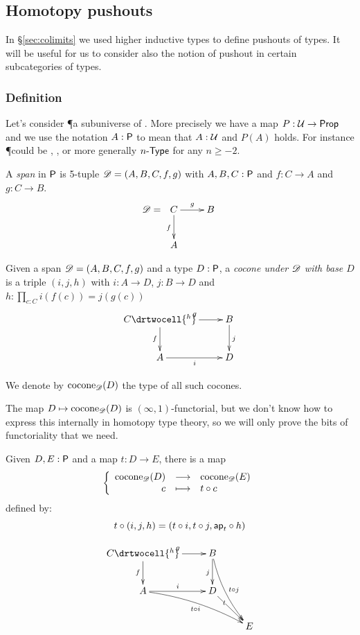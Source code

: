 \subsection{Homotopy pushouts}
\label{sec:pushouts}

In \S\ref{sec:colimits} we used higher inductive types to define pushouts of types.
It will be useful for us to consider also the notion of pushout in certain subcategories of types.

\subsubsection{Definition}
\label{sec:push:definition}

Let's consider \P a subuniverse of \type. More precisely we have a map
$P:\type\to\prop$ and we use the notation $A:\P$ to mean that $A:\type$ and
$P(A)$ holds. For instance \P could be \prop, \set, or more generally
$\typele{n}$ for any $n\ge-2$.

\begin{defn}
  A \emph{span} in $\P$ is 5-tuple $\Ddiag=(A,B,C,f,g)$ with
  $A,B,C:\P$ and $f:C\to{}A$ and $g:C\to{}B$.
  \[\Ddiag=\xymatrix{C \ar^g[r] \ar_f[d] & B \\ A & }\]
\end{defn}

\begin{defn}
  Given a span $\Ddiag=(A,B,C,f,g)$ and a type $D:\P$, a
  \emph{cocone under $\Ddiag$ with base $D$} is a triple $(i, j, h)$ with
  $i:A\to{}D$, $j:B\to{}D$ and $h : \prod_{c:C}i(f(c))=j(g(c))$
  \[\uppercurveobject{{ }}\lowercurveobject{{ }}\twocellhead{{ }}
  \xymatrix{C \ar^g[r] \ar_f[d] \drtwocell{^h} & B \ar^j[d] \\ A \ar_i[r] & D
  }\]

  We denote by $\cocone{\Ddiag}{D}$ the type of all such cocones.
\end{defn}

The map $D\mapsto\cocone{\Ddiag}{D}$ is $(\infty,1)$-functorial, but we don't
know how to express this internally in homotopy type theory, so we will only
prove the bits of functoriality that we need.

\begin{defn}
  Given $D,E:\P$ and a map $t:D\to{}E$, there is a map
  \[\function{\cocone{\Ddiag}{D}}{\cocone{\Ddiag}{E}}{c}{\composecocone{t}c}\]
  defined by:
  \[\composecocone{t}(i,j,h)=(t\circ{}i,t\circ{}j,\mapfunc{t}\circ{}h)\]

  \[\uppercurveobject{{ }}\lowercurveobject{{ }}\twocellhead{{ }}
  \xymatrix{C \ar^g[r] \ar_f[d] \drtwocell{^h} & B \ar_j[d]
    \ar@/_/^{t\circ{}j}[rdd] & \\
    A \ar^i[r] \ar@/^/_{t\circ{}i}[rrd] & D \ar[rd]|<<<<t & \\
    & & E }\]
\end{defn}

